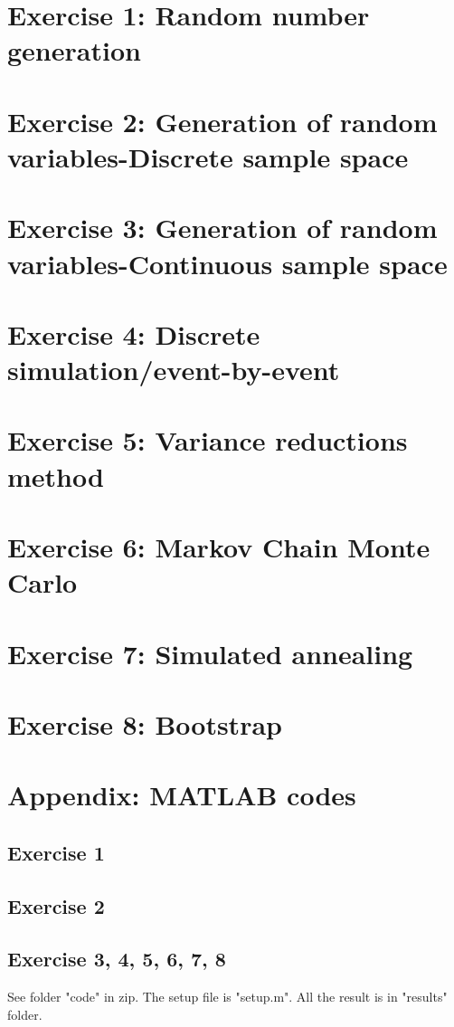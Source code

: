 \documentclass[11pt]{article}
\begin{document}
\thispagestyle{empty}
 

\clearpage
 


\section{Exercise 1: Random number generation}

\section{Exercise 2: Generation of random variables-Discrete sample space}

\section{Exercise 3: Generation of random variables-Continuous sample space}

\section{Exercise 4: Discrete simulation/event-by-event}

\section{Exercise 5: Variance reductions method}

\section{Exercise 6: Markov Chain Monte Carlo}

\section{Exercise 7: Simulated annealing}

\section{Exercise 8: Bootstrap}

\clearpage
\appendix
\section{Appendix: MATLAB codes}
\subsection{Exercise 1} \label{app:main}
 
\subsection{Exercise 2} \label{app:main}
 
\subsection{Exercise 3, 4, 5, 6, 7, 8}
See folder "code" in zip. The setup file is "setup.m". All the result is in "results" folder.
\newpage
%
\printbibliography
\end{document}
